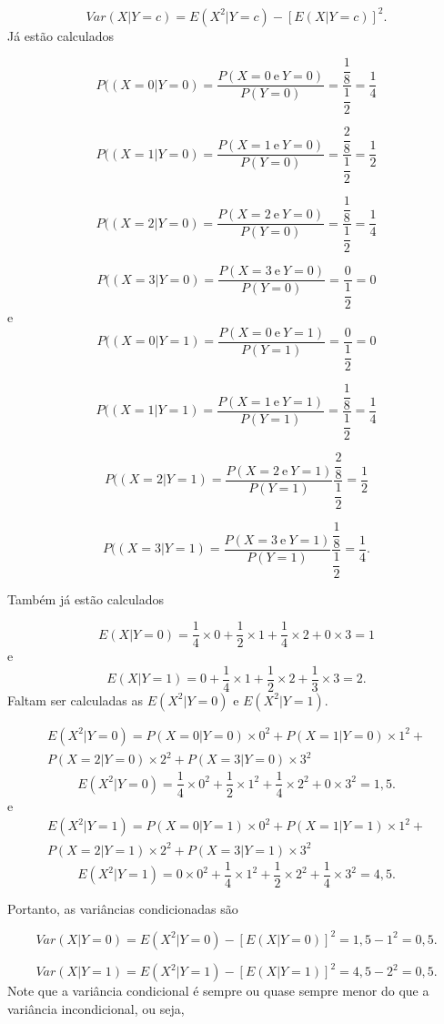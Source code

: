 \documentclass[
]{book}
\begin{document}
\[
  Var(X|Y=c) = E(X^2|Y=c) - [E(X|Y=c)]^2.
\]
Já estão calculados

\[
  P((X=0|Y=0) = \dfrac{P(X=0~\text{e}~Y=0)}{P(Y=0)}= \dfrac{\dfrac{1}{8}}{\dfrac{1}{2}}= \dfrac{1}{4}
\]

\[
  P((X=1|Y=0) = \dfrac{P(X=1~\text{e}~Y=0)}{P(Y=0)}= \dfrac{\dfrac{2}{8}}{\dfrac{1}{2}}= \dfrac{1}{2}
\]

\[
  P((X=2|Y=0) = \dfrac{P(X=2~\text{e}~Y=0)}{P(Y=0)}= \dfrac{\dfrac{1}{8}}{\dfrac{1}{2}}= \dfrac{1}{4}
\]

\[
  P((X=3|Y=0) = \dfrac{P(X=3~\text{e}~Y=0)}{P(Y=0)}= \dfrac{0}{\dfrac{1}{2}}= 0
\]
e
\[
  P((X=0|Y=1) = \dfrac{P(X=0~\text{e}~Y=1)}{P(Y=1)}= \dfrac{0}{\dfrac{1}{2}}= 0
\]

\[
  P((X=1|Y=1) = \dfrac{P(X=1~\text{e}~Y=1)}{P(Y=1)}= \dfrac{\dfrac{1}{8}}{\dfrac{1}{2}}= \dfrac{1}{4}
\]

\[
  P((X=2|Y=1) = \dfrac{P(X=2~\text{e}~Y=1)}{P(Y=1)} \dfrac{\dfrac{2}{8}}{\dfrac{1}{2}}= \dfrac{1}{2}
\]

\[
  P((X=3|Y=1) = \dfrac{P(X=3~\text{e}~Y=1)}{P(Y=1)} \dfrac{\dfrac{1}{8}}{\dfrac{1}{2}}= \dfrac{1}{4}.
\]

Também já estão calculados

\[
  E(X|Y=0) = \frac{1}{4}\times 0 + \frac{1}{2} \times 1 + \frac{1}{4}\times 2 + 0 \times 3 = 1
\]
e
\[
  E(X|Y=1) = 0 + \frac{1}{4} \times 1 + \frac{1}{2}\times 2 + \dfrac{1}{3} \times 3 = 2.
\]
Faltam ser calculadas as \(E(X^2|Y=0)\) e \(E(X^2|Y=1)\).

\begin{multline}
  E(X^2|Y=0) = P(X=0|Y=0) \times 0^2 + P(X=1|Y=0)\times 1^2 +\\
  P(X=2|Y=0) \times 2^2 + P(X=3|Y=0) \times 3^2
\end{multline}
\[
  E(X^2|Y=0) = \dfrac{1}{4} \times 0^2 + \dfrac{1}{2}\times 1^2 +
  \dfrac{1}{4} \times 2^2 + 0 \times 3^2 = 1,5.
\]
e
\begin{multline}
  E(X^2|Y=1) = P(X=0|Y=1) \times 0^2 + P(X=1|Y=1)\times 1^2 +\\
  P(X=2|Y=1) \times 2^2 + P(X=3|Y=1) \times 3^2
\end{multline}
\[
  E(X^2|Y=1) = 0 \times 0^2 + \dfrac{1}{4}\times 1^2 +
  \dfrac{1}{2} \times 2^2 + \dfrac{1}{4} \times 3^2 = 4,5.
\]

Portanto, as variâncias condicionadas são

\[
  Var(X|Y=0) = E(X^2|Y=0) - [E(X|Y=0)]^2 = 1,5 - 1^2 = 0,5.
\]

\[
  Var(X|Y=1) = E(X^2|Y=1) - [E(X|Y=1)]^2 = 4,5 - 2^2 = 0,5.
\]
Note que a variância condicional é sempre ou quase sempre menor do que a variância incondicional, ou seja,
\end{document}
